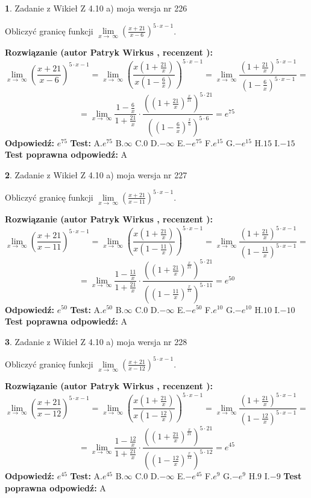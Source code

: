 \documentclass[12pt, a4paper]{article}
\theoremstyle{definition} %
\newtheorem{zad}{}
\newcommand{\zadStart}[1]{\begin{zad}#1\newline}
\newcommand{\zadStop}{\end{zad}}
\newcommand{\rozwStart}[2]{\noindent \textbf{Rozwiązanie (autor #1 , recenzent #2): }\newline}
\newcommand{\rozwStop}{\newline}
\newcommand{\odpStart}{\noindent \textbf{Odpowiedź:}\newline}
\newcommand{\odpStop}{\newline}
\newcommand{\testStart}{\noindent \textbf{Test:}\newline}
\newcommand{\testStop}{\newline}
\newcommand{\kluczStart}{\noindent \textbf{Test poprawna odpowiedź:}\newline}
\newcommand{\kluczStop}{\newline}
\begin{document}
\zadStart{Zadanie z Wikieł Z 4.10 a) moja wersja nr 226}

Obliczyć granicę funkcji  $\lim\limits_{x\to\ \infty}(\frac{x+21}{x-6})^{5\cdot x-1}$.
\zadStop
\rozwStart{Patryk Wirkus}{}
$$\lim\limits_{x\to\ \infty}(\frac{x+21}{x-6})^{5\cdot x-1} = \lim\limits_{x\to\ \infty}(\frac{x(1+\frac{21}{x})}{x(1-\frac{6}{x})})^{5\cdot x-1}=\lim\limits_{x\to\ \infty}\frac{(1+\frac{21}{x})^{5\cdot x-1}}{(1-\frac{6}{x})^{5\cdot x-1}}=$$
$$=\lim\limits_{x\to\ \infty}\frac{1-\frac{6}{x}}{1+\frac{21}{x}}\cdot\frac{((1+\frac{21}{x})^{\frac{x}{21}})^{5\cdot21}}{((1-\frac{6}{x})^{\frac{x}{6}})^{5\cdot6}}=e^{75}$$
\rozwStop
\odpStart
$e^{75}$
\odpStop
\testStart
A.$e^{75}$ B.$\infty$ C.$0$ D.$-\infty$ E.$-e^{75}$
F.$e^{15}$ G.$-e^{15}$
H.$15$
I.$-15$
\testStop
\kluczStart
A
\kluczStop



\zadStart{Zadanie z Wikieł Z 4.10 a) moja wersja nr 227}

Obliczyć granicę funkcji  $\lim\limits_{x\to\ \infty}(\frac{x+21}{x-11})^{5\cdot x-1}$.
\zadStop
\rozwStart{Patryk Wirkus}{}
$$\lim\limits_{x\to\ \infty}(\frac{x+21}{x-11})^{5\cdot x-1} = \lim\limits_{x\to\ \infty}(\frac{x(1+\frac{21}{x})}{x(1-\frac{11}{x})})^{5\cdot x-1}=\lim\limits_{x\to\ \infty}\frac{(1+\frac{21}{x})^{5\cdot x-1}}{(1-\frac{11}{x})^{5\cdot x-1}}=$$
$$=\lim\limits_{x\to\ \infty}\frac{1-\frac{11}{x}}{1+\frac{21}{x}}\cdot\frac{((1+\frac{21}{x})^{\frac{x}{21}})^{5\cdot21}}{((1-\frac{11}{x})^{\frac{x}{11}})^{5\cdot11}}=e^{50}$$
\rozwStop
\odpStart
$e^{50}$
\odpStop
\testStart
A.$e^{50}$ B.$\infty$ C.$0$ D.$-\infty$ E.$-e^{50}$
F.$e^{10}$ G.$-e^{10}$
H.$10$
I.$-10$
\testStop
\kluczStart
A
\kluczStop



\zadStart{Zadanie z Wikieł Z 4.10 a) moja wersja nr 228}

Obliczyć granicę funkcji  $\lim\limits_{x\to\ \infty}(\frac{x+21}{x-12})^{5\cdot x-1}$.
\zadStop
\rozwStart{Patryk Wirkus}{}
$$\lim\limits_{x\to\ \infty}(\frac{x+21}{x-12})^{5\cdot x-1} = \lim\limits_{x\to\ \infty}(\frac{x(1+\frac{21}{x})}{x(1-\frac{12}{x})})^{5\cdot x-1}=\lim\limits_{x\to\ \infty}\frac{(1+\frac{21}{x})^{5\cdot x-1}}{(1-\frac{12}{x})^{5\cdot x-1}}=$$
$$=\lim\limits_{x\to\ \infty}\frac{1-\frac{12}{x}}{1+\frac{21}{x}}\cdot\frac{((1+\frac{21}{x})^{\frac{x}{21}})^{5\cdot21}}{((1-\frac{12}{x})^{\frac{x}{12}})^{5\cdot12}}=e^{45}$$
\rozwStop
\odpStart
$e^{45}$
\odpStop
\testStart
A.$e^{45}$ B.$\infty$ C.$0$ D.$-\infty$ E.$-e^{45}$
F.$e^{9}$ G.$-e^{9}$
H.$9$
I.$-9$
\testStop
\kluczStart
A
\kluczStop
\end{document}
